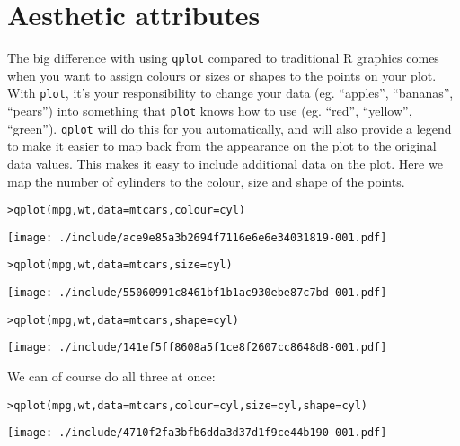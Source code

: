 \section{Aesthetic attributes}\label{sec:aesthetic_attributes}

The big difference with using {\tt qplot} compared to traditional R graphics comes when you want to assign colours or sizes or shapes to the points on your plot.  With {\tt plot}, it's your responsibility to change your data (eg. ``apples'', ``bananas'', ``pears'') into something that {\tt plot} knows how to use (eg. ``red'', ``yellow'', ``green'').  {\tt qplot} will do this for you automatically, and will also provide a legend to make it easier to map back from the appearance on the plot to the original data values.  This makes it easy to include additional data on the plot.  Here we map the number of cylinders to the colour, size and shape of the points.

\begin{alltt}
> qplot(mpg, wt, data = mtcars, colour = cyl)
\end{alltt}
\texttt{[image: ./include/ace9e85a3b2694f7116e6e6e34031819-001.pdf]}
\begin{alltt}

> qplot(mpg, wt, data = mtcars, size = cyl)
\end{alltt}
\texttt{[image: ./include/55060991c8461bf1b1ac930ebe87c7bd-001.pdf]}
\begin{alltt}

> qplot(mpg, wt, data = mtcars, shape = cyl)
\end{alltt}
\texttt{[image: ./include/141ef5ff8608a5f1ce8f2607cc8648d8-001.pdf]}
\begin{alltt}

\end{alltt}

We can of course do all three at once:

\begin{alltt}
> qplot(mpg, wt, data = mtcars, colour = cyl, size = cyl, shape = cyl)
\end{alltt}
\texttt{[image: ./include/4710f2fa3bfb6dda3d37d1f9ce44b190-001.pdf]}
\begin{alltt}

\end{alltt}

